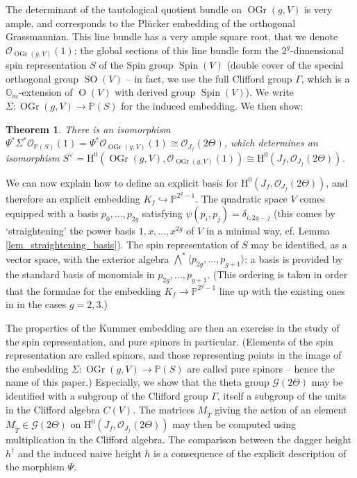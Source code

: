 \documentclass{article} %
\newtheorem{theorem}[proposition]{Theorem}
\numberwithin{equation}{section}
\newcommand{\G}{\mathbb{G}}
\DeclareMathOperator{\SO}{SO}
\DeclareMathOperator{\OO}{O}
\DeclareMathOperator{\Spin}{Spin}
\renewcommand{\P}{\mathbb{P}}
\newcommand{\HH}{\mathrm{H}}
\newcommand{\cO}{\mathcal{O}}
\DeclareMathOperator{\OGr}{OGr}
\begin{document}
The determinant of the tautological quotient bundle on $\OGr(g, V)$ is very ample, and corresponds to the Pl\"ucker embedding of the orthogonal Grassmannian. This line bundle has a very ample square root, that we denote $\cO_{\OGr(g, V)}(1)$; the global sections of this line bundle form the $2^g$-dimensional spin representation $S$ of the Spin group $\Spin(V)$ (double cover of the special orthogonal group $\SO(V)$ -- in fact, we use the full Clifford group $\Gamma$, which is a $\G_m$-extension of $\OO(V)$ with derived group $\Spin(V)$). We write $\Sigma : \OGr(g, V) \to \P(S)$ for the induced embedding. We then show:
\begin{theorem}
    There is an isomorphism $\Psi^\ast \Sigma^\ast \cO_{\P(S)}(1) = \Psi^\ast \cO_{\OGr(g, V)}(1) \cong \cO_{J_f}(2 \Theta)$, which determines an isomorphism $S^\vee = \HH^0(\OGr(g, V), \cO_{\OGr(g, V)}(1)) \cong\HH^0(J_f, \cO_{J_f}(2 \Theta))$.
\end{theorem}
We can now explain how to define an explicit basis for $\HH^0(J_f, \cO_{J_f}(2 \Theta))$, and therefore an explicit embedding $K_f \hookrightarrow \P^{2^g-1}$. The quadratic space $V$ comes equipped with a basis $p_0, \dots, p_{2g}$ satisfying $\psi(p_i, p_j) = \delta_{i, 2g-j}$ (this comes by `straightening' the power basis $1, x, \dots, x^{2g}$ of $V$ in a minimal way, cf. Lemma \ref{lem_straightening_basis}). The spin representation of $S$ may be identified, as a vector space, with the exterior algebra $\bigwedge^\ast \langle p_{2g}, \dots, p_{g+1} \rangle$: a basis is provided by the standard basis of monomials in $p_{2g}, \dots, p_{g+1}$. (This ordering is taken in order that the formulae for the embedding $K_f \to \P^{2^g-1}$ line up with the existing ones in \cite{CasselsFlynnProlegomena, Mul14} in the cases $g = 2, 3$.)

 The properties of the Kummer embedding are then an exercise in the study of the spin representation, and pure spinors in particular. (Elements of the spin representation are called spinors, and those representing points in the image of the embedding $\Sigma : \OGr(g, V) \to \P(S)$ are called pure spinors -- hence the name of this paper.)
Especially, we show that the theta group $\mathcal{G}(2 \Theta)$ may be identified with a subgroup of the Clifford group $\Gamma$, itself a subgroup of the units in the Clifford algebra $C(V)$. The matrices $M_{\widetilde{T}}$ giving the action of an element $M_{\widetilde{T}} \in \mathcal{G}(2 \Theta)$ on $\HH^0(J_f, \cO_{J_f}(2 \Theta))$ may then be computed using multiplication in the Clifford algebra. The comparison between the dagger height $h^\dagger$ and the induced naive height $h$ is a consequence of the explicit description of the morphism $\Psi$.
\end{document}
